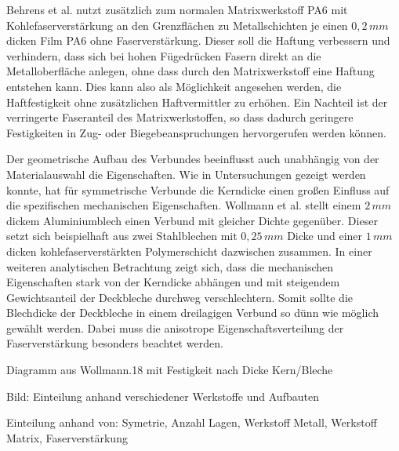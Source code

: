 Behrens et al. \cite{BerndArno.2017} nutzt zusätzlich zum normalen Matrixwerkstoff PA6 mit Kohlefaserverstärkung an den Grenzflächen zu Metallschichten je einen $0,2 \, mm$ dicken Film PA6 ohne Faserverstärkung. Dieser soll die Haftung verbessern und verhindern, dass sich bei hohen Fügedrücken Fasern direkt an die Metalloberfläche anlegen, ohne dass durch den Matrixwerkstoff eine Haftung entstehen kann. Dies kann also als Möglichkeit angesehen werden, die Haftfestigkeit ohne zusätzlichen Haftvermittler zu erhöhen. Ein Nachteil ist der verringerte Faseranteil des Matrixwerkstoffen, so dass dadurch geringere Festigkeiten in Zug- oder Biegebeanspruchungen hervorgerufen werden können. 


Der geometrische Aufbau des Verbundes beeinflusst auch unabhängig von der Materialauswahl die Eigenschaften. Wie in Untersuchungen gezeigt werden konnte, hat für symmetrische Verbunde die Kerndicke einen großen Einfluss auf die spezifischen mechanischen Eigenschaften.
Wollmann et al. \cite{Wollmann.2018} stellt einem $2\,mm$ dickem Aluminiumblech einen Verbund mit gleicher Dichte gegenüber. Dieser setzt sich beispielhaft aus zwei Stahlblechen mit $0,25\,mm$ Dicke und einer $1\,mm$ dicken kohlefaserverstärkten Polymerschicht dazwischen zusammen. In einer weiteren analytischen Betrachtung zeigt sich, dass die mechanischen Eigenschaften stark von der Kerndicke abhängen und mit steigendem Gewichtsanteil der Deckbleche durchweg verschlechtern. Somit sollte die Blechdicke der Deckbleche in einem dreilagigen Verbund so dünn wie möglich gewählt werden. Dabei muss die anisotrope Eigenschaftsverteilung der Faserverstärkung besonders beachtet werden. 

Diagramm aus Wollmann.18 mit Festigkeit nach Dicke Kern/Bleche






Bild: Einteilung anhand verschiedener Werkstoffe und Aufbauten


Einteilung anhand von: Symetrie, Anzahl Lagen, Werkstoff Metall, Werkstoff Matrix, Faserverstärkung









